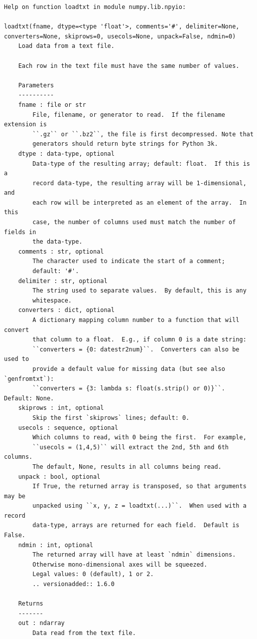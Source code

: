 \documentclass{book}
\begin{document}
\begin{verbatim}
Help on function loadtxt in module numpy.lib.npyio:

loadtxt(fname, dtype=<type 'float'>, comments='#', delimiter=None, converters=None, skiprows=0, usecols=None, unpack=False, ndmin=0)
    Load data from a text file.

    Each row in the text file must have the same number of values.

    Parameters
    ----------
    fname : file or str
        File, filename, or generator to read.  If the filename extension is
        ``.gz`` or ``.bz2``, the file is first decompressed. Note that
        generators should return byte strings for Python 3k.
    dtype : data-type, optional
        Data-type of the resulting array; default: float.  If this is a
        record data-type, the resulting array will be 1-dimensional, and
        each row will be interpreted as an element of the array.  In this
        case, the number of columns used must match the number of fields in
        the data-type.
    comments : str, optional
        The character used to indicate the start of a comment;
        default: '#'.
    delimiter : str, optional
        The string used to separate values.  By default, this is any
        whitespace.
    converters : dict, optional
        A dictionary mapping column number to a function that will convert
        that column to a float.  E.g., if column 0 is a date string:
        ``converters = {0: datestr2num}``.  Converters can also be used to
        provide a default value for missing data (but see also `genfromtxt`):
        ``converters = {3: lambda s: float(s.strip() or 0)}``.  Default: None.
    skiprows : int, optional
        Skip the first `skiprows` lines; default: 0.
    usecols : sequence, optional
        Which columns to read, with 0 being the first.  For example,
        ``usecols = (1,4,5)`` will extract the 2nd, 5th and 6th columns.
        The default, None, results in all columns being read.
    unpack : bool, optional
        If True, the returned array is transposed, so that arguments may be
        unpacked using ``x, y, z = loadtxt(...)``.  When used with a record
        data-type, arrays are returned for each field.  Default is False.
    ndmin : int, optional
        The returned array will have at least `ndmin` dimensions.
        Otherwise mono-dimensional axes will be squeezed.
        Legal values: 0 (default), 1 or 2.
        .. versionadded:: 1.6.0

    Returns
    -------
    out : ndarray
        Data read from the text file.


\end{verbatim}
\end{document}
